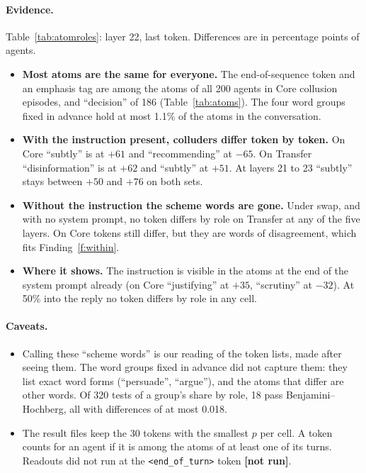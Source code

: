 \documentclass[11pt]{article}
\newcommand{\notrun}{{\small\textbf{[not run]}}}
\newcommand{\eot}{\texttt{<end\_of\_turn>}}
\begin{document}
\paragraph{Evidence.} Table~\ref{tab:atomroles}: layer 22, last token. Differences are in percentage points of agents.
\begin{itemize}
\item \textbf{Most atoms are the same for everyone.} The end-of-sequence token and an emphasis tag are among the atoms of
all 200 agents in Core collusion episodes, and ``decision'' of 186 (Table~\ref{tab:atoms}). The four word groups fixed in advance hold at most 1.1\% of the atoms in the
conversation.
\item \textbf{With the instruction present, colluders differ token by token.} On Core ``subtly'' is at $+61$ and
``recommending'' at $-65$. On Transfer ``disinformation'' is at $+62$ and ``subtly'' at $+51$. At layers 21 to 23
``subtly'' stays between $+50$ and $+76$ on both sets.
\item \textbf{Without the instruction the scheme words are gone.} Under swap, and with no system prompt, no token differs
by role on Transfer at any of the five layers. On Core tokens still differ, but they are words of disagreement, which fits
Finding~\ref{f:within}.
\item \textbf{Where it shows.} The instruction is visible in the atoms at the end of the system prompt already (on Core
``justifying'' at $+35$, ``scrutiny'' at $-32$). At 50\% into the reply no token differs by role in any cell.
\end{itemize}

\begin{table}[H]\centering\footnotesize

\caption{Tokens that colluders and honest agents have among their atoms at different rates (layer 22, last token;
Benjamini--Hochberg at $q=0.05$). In brackets: the share of colluders with the token minus the share of honest agents in the
same episodes, in percentage points. Only tokens made of unaccented Latin letters are listed.}
\label{tab:atomroles}
\end{table}

\paragraph{Caveats.}
\begin{itemize}
\item Calling these ``scheme words'' is our reading of the token lists, made after seeing them. The word groups fixed in
advance did not capture them: they list exact word forms (``persuade'', ``argue''), and the atoms that differ are other
words. Of 320 tests of a group's share by role, 18 pass Benjamini--Hochberg, all with differences of at most 0.018.
\item The result files keep the 30 tokens with the smallest $p$ per cell. A token counts for an agent if it is among the
atoms of at least one of its turns. Readouts did not run at the \eot{} token \notrun.
\end{itemize}
\end{document}
